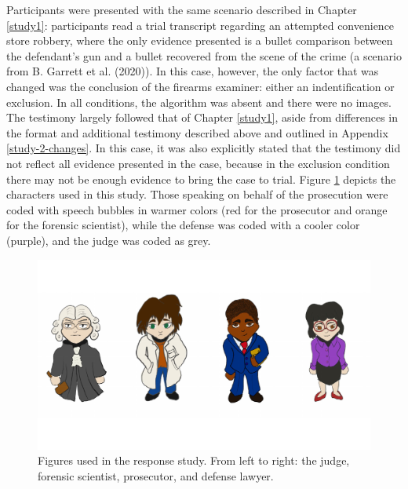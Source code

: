 \documentclass[print]{nuthesis}
\begin{document}
Participants were presented with the same scenario described in Chapter \ref{study1}: participants read a trial transcript regarding an attempted convenience store robbery, where the only evidence presented is a bullet comparison between the defendant's gun and a bullet recovered from the scene of the crime (a scenario from B. Garrett et al. (2020)).
In this case, however, the only factor that was changed was the conclusion of the firearms examiner: either an indentification or exclusion.
In all conditions, the algorithm was absent and there were no images.
The testimony largely followed that of Chapter \ref{study1}, aside from differences in the format and additional testimony described above and outlined in Appendix \ref{study-2-changes}.
In this case, it was also explicitly stated that the testimony did not reflect all evidence presented in the case, because in the exclusion condition there may not be enough evidence to bring the case to trial.
Figure \ref{fig:responsefigures} depicts the characters used in this study.
Those speaking on behalf of the prosecution were coded with speech bubbles in warmer colors (red for the prosecutor and orange for the forensic scientist), while the defense was coded with a cooler color (purple), and the judge was coded as grey.

\begin{figure}

{\centering \includegraphics[width=\linewidth]{thesis_files/figure-latex/responsefigures-1} 

}

\caption{Figures used in the response study. From left to right: the judge, forensic scientist, prosecutor, and defense lawyer.}\label{fig:responsefigures}
\end{figure}
\end{document}
